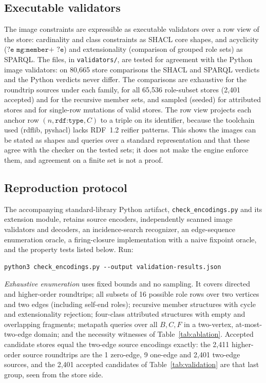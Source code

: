 \documentclass[11pt]{article}
\theoremstyle{plain}
\theoremstyle{definition}
\theoremstyle{remark}
\newcommand{\iri}[1]{\texttt{#1}}
\begin{document}
\subsection{Executable validators}\label{sec:shacl}
The image constraints are expressible as executable validators over a row view of the
store: cardinality and class constraints as SHACL core shapes, and acyclicity
($\texttt{?e mg:member+ ?e}$) and extensionality (comparison of grouped role sets) as
SPARQL. The files, in \texttt{validators/}, are tested for agreement with the Python image
validators: on 80{,}665 store comparisons the SHACL and SPARQL verdicts and the Python
verdicts never differ. The comparisons are exhaustive for the roundtrip sources
under each family, for all 65{,}536 role-subset stores (2{,}401 accepted) and for the recursive
member sets, and sampled (seeded) for attributed stores and for single-row mutations of
valid stores. The row view projects each anchor row $(n,\iri{rdf:type},C)$ to a triple on
its identifier, because the toolchain used (rdflib, pyshacl) lacks RDF~1.2 reifier
patterns. This shows the images can be stated as shapes and queries over a standard
representation and that these agree with the checker on the tested sets; it does not make
the engine enforce them, and agreement on a finite set is not a proof.

\subsection{Reproduction protocol}\label{sec:checks}
The accompanying standard-library Python artifact, \texttt{check\_encodings.py} and
its extension module, retains source encoders, independently scanned image
validators and decoders, an incidence-search recognizer, an edge-sequence enumeration
oracle, a firing-closure implementation with a naive fixpoint oracle, and the property
tests listed below. Run:
\begin{verbatim}
python3 check_encodings.py --output validation-results.json
\end{verbatim}
\emph{Exhaustive enumeration} uses fixed bounds and no sampling. It covers directed and
higher-order roundtrips; all subsets of 16 possible role rows over two vertices and two
edges (including self-end roles); recursive member structures with cycle and
extensionality rejection; four-class attributed structures with empty and overlapping
fragments; metapath queries over all $B,C,F$ in a two-vertex, at-most-two-edge domain;
and the necessity witnesses of Table~\ref{tab:ablation}. Accepted candidate stores
equal the two-edge source encodings exactly: the 2{,}411 higher-order source roundtrips are
the 1 zero-edge, 9 one-edge and 2{,}401 two-edge sources, and the 2{,}401 accepted
candidates of Table~\ref{tab:validation} are that last group, seen from the store side.
\end{document}
